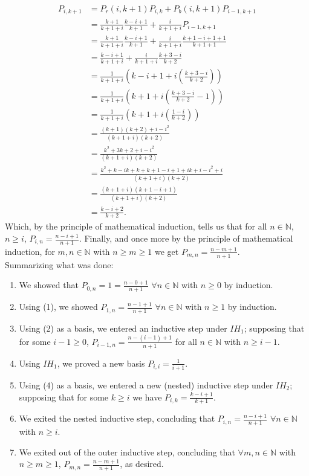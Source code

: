 \documentclass[11pt, letterpaper]{article}
\newcommand{\mbb}[1]{\mathbb{#1}}
\begin{document}
    \begin{align*}
        P_{i,k+1}&=P_r(i,k+1)P_{i,k}+P_b(i,k+1)P_{i-1,k+1}\\
        &=\frac{k+1}{k+1+i}\frac{k-i+1}{k+1}+\frac{i}{k+1+i}P_{i-1,k+1}\tag{$IH_2$}\\
        &=\frac{k+1}{k+1+i}\frac{k-i+1}{k+1}+\frac{i}{k+1+i}\frac{k+1-i+1+1}{k+1+1}\tag{$IH_1$}\\
        &=\frac{k-i+1}{k+1+i}+\frac{i}{k+1+i}\frac{k+3-i}{k+2}\\
        &=\frac{1}{k+1+i}\left(k-i+1+i\left(\frac{k+3-i}{k+2}\right)\right)\\
        &=\frac{1}{k+1+i}\left(k+1+i\left(\frac{k+3-i}{k+2}-1\right)\right)\\
        &=\frac{1}{k+1+i}\left(k+1+i\left(\frac{1-i}{k+2}\right)\right)\\
        &=\frac{(k+1)(k+2)+i-i^2}{(k+1+i)(k+2)}\\
        &=\frac{k^2+3k+2+i-i^2}{(k+1+i)(k+2)}\\
        &=\frac{k^2+k-ik+k+k+1-i+1+ik+i-i^2+i}{(k+1+i)(k+2)}\\
        &=\frac{(k+1+i)(k+1-i+1)}{(k+1+i)(k+2)}\\
        &=\frac{k-i+2}{k+2}.
    \end{align*}
    Which, by the principle of mathematical induction, tells us that for all $n\in\mbb{N}$, $n\geq i$, $P_{i,n}=\frac{n-i+1}{n+1}$. Finally, and once more by the 
    principle of mathematical induction, for $m,n\in\mbb{N}$ with $n\geq m\geq 1$ we get $P_{m,n}=\frac{n-m+1}{n+1}$.\\[10pt]
    Summarizing what was done:
    \begin{enumerate}
        \item We showed that $P_{0,n}=1=\frac{n-0+1}{n+1}$ $\forall n\in\mbb{N}$ with $n\geq 0$ by induction.
        \item Using (1), we showed $P_{1,n}=\frac{n-1+1}{n+1}$ $\forall n\in\mbb{N}$ with $n\geq 1$ by induction.
        \item Using (2) as a basis, we entered an inductive step under $IH_1$; supposing that for some $i-1\geq 0$, $P_{i-1,n}=\frac{n-(i-1)+1}{n+1}$ for all $n\in\mbb{N}$ with $n\geq i-1$.
        \item Using $IH_1$, we proved a new basis $P_{i,i}=\frac{1}{i+1}$.
        \item Using (4) as a basis, we entered a new (nested) inductive step under $IH_2$; supposing that for some $k\geq i$ we have $P_{i,k}=\frac{k-i+1}{k+1}$.
        \item We exited the nested inductive step, concluding that $P_{i,n}=\frac{n-i+1}{n+1}$ $\forall n\in\mbb{N}$ with $n\geq i$.
        \item We exited out of the outer inductive step, concluding that $\forall m,n\in\mbb{N}$ with $n\geq m\geq 1$, $P_{m,n}=\frac{n-m+1}{n+1}$, as desired.
    \end{enumerate}
\end{document}
